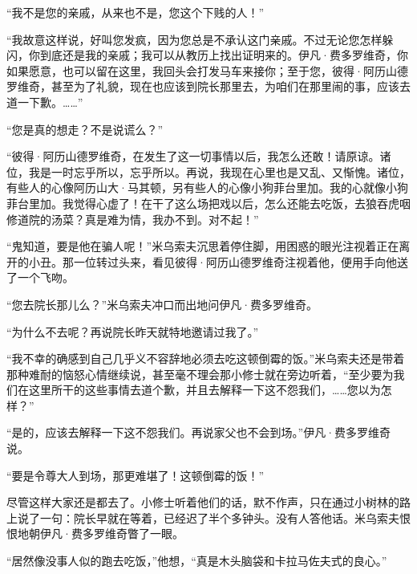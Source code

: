 \par “我不是您的亲戚，从来也不是，您这个下贱的人！”
\par “我故意这样说，好叫您发疯，因为您总是不承认这门亲戚。不过无论您怎样躲闪，你到底还是我的亲戚；我可以从教历上找出证明来的。伊凡·费多罗维奇，你如果愿意，也可以留在这里，我回头会打发马车来接你；至于您，彼得·阿历山德罗维奇，甚至为了礼貌，现在也应该到院长那里去，为咱们在那里闹的事，应该去道一下歉。……”
\par “您是真的想走？不是说谎么？”
\par “彼得·阿历山德罗维奇，在发生了这一切事情以后，我怎么还敢！请原谅。诸位，我是一时忘乎所以，忘乎所以。再说，我现在心里也是又乱、又惭愧。诸位，有些人的心像阿历山大·马其顿，另有些人的心像小狗菲台里加。我的心就像小狗菲台里加。我觉得心虚了！在干了这么场把戏以后，怎么还能去吃饭，去狼吞虎咽修道院的汤菜？真是难为情，我办不到。对不起！”
\par “鬼知道，要是他在骗人呢！”米乌索夫沉思着停住脚，用困惑的眼光注视着正在离开的小丑。那一位转过头来，看见彼得·阿历山德罗维奇注视着他，便用手向他送了一个飞吻。
\par “您去院长那儿么？”米乌索夫冲口而出地问伊凡·费多罗维奇。
\par “为什么不去呢？再说院长昨天就特地邀请过我了。”
\par “我不幸的确感到自己几乎义不容辞地必须去吃这顿倒霉的饭。”米乌索夫还是带着那种难耐的恼怒心情继续说，甚至毫不理会那小修士就在旁边听着，“至少要为我们在这里所干的这些事情去道个歉，并且去解释一下这不怨我们，……您以为怎样？”
\par “是的，应该去解释一下这不怨我们。再说家父也不会到场。”伊凡·费多罗维奇说。
\par “要是令尊大人到场，那更难堪了！这顿倒霉的饭！”
\par 尽管这样大家还是都去了。小修士听着他们的话，默不作声，只在通过小树林的路上说了一句：院长早就在等着，已经迟了半个多钟头。没有人答他话。米乌索夫恨恨地朝伊凡·费多罗维奇瞥了一眼。
\par “居然像没事人似的跑去吃饭，”他想，“真是木头脑袋和卡拉马佐夫式的良心。”
